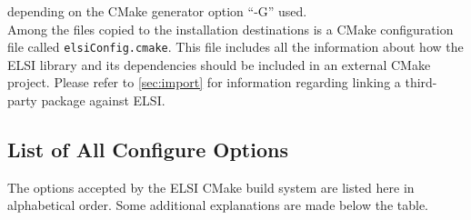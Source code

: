\documentclass{report}
\begin{document}
depending on the CMake generator option ``-G'' used.\\

Among the files copied to the installation destinations is a CMake configuration file called \texttt{elsiConfig.cmake}.  This file includes all the information about how the ELSI library and its dependencies should be included in an external CMake project.  Please refer to \ref{sec:import} for information regarding linking a third-party package against ELSI.\\

\subsection{List of All Configure Options}
\label{subsec:config_keywords}
The options accepted by the ELSI CMake build system are listed here in alphabetical order.  Some additional explanations are made below the table.\\
\end{document}
